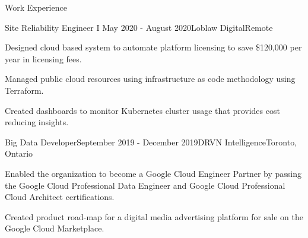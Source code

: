 \documentclass{resume} %
\begin{document}
\begin{rSection}{Work Experience}

\begin{rSubsection}{Site Reliability Engineer I }{May 2020 - August 2020}{Loblaw Digital}{Remote}
\item Designed cloud based system to automate platform licensing to save \$120,000 per year in licensing fees.
\item Managed public cloud resources using infrastructure as code methodology using Terraform.
\item Created dashboards to monitor Kubernetes cluster usage that provides cost reducing insights.
\end{rSubsection}


\begin{rSubsection}{Big Data Developer}{September 2019 - December 2019}{DRVN Intelligence}{Toronto, Ontario}
\item Enabled the organization to become a Google Cloud Engineer Partner by passing the Google Cloud Professional Data Engineer and Google Cloud Professional Cloud Architect certifications.
\item Created product road-map for a digital media advertising platform for sale on the Google Cloud Marketplace.
\end{rSubsection}


\end{rSection}




\end{document}
